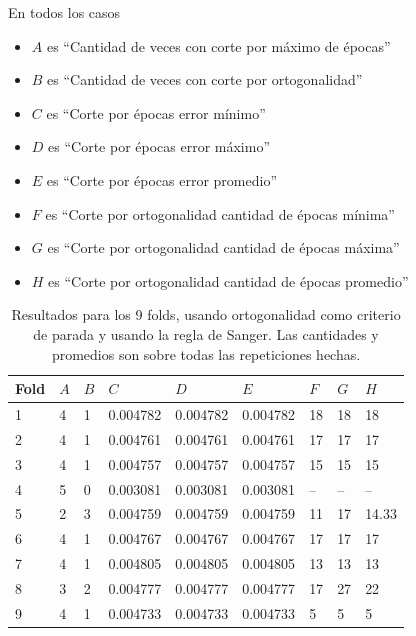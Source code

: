 \documentclass[informe.tex]{subfiles}
\begin{document}
	En todos los casos 
	\begin{itemize}
	\item $A$ es ``Cantidad de veces con corte por máximo de épocas''
	\item $B$ es ``Cantidad de veces con corte por ortogonalidad''
	\item $C$ es ``Corte por épocas error mínimo''
	\item $D$ es ``Corte por épocas error máximo''
	\item $E$ es ``Corte por épocas error promedio''
	\item $F$ es ``Corte por ortogonalidad cantidad de épocas mínima''
	\item $G$ es ``Corte por ortogonalidad cantidad de épocas máxima''
	\item $H$ es ``Corte por ortogonalidad cantidad de épocas promedio''
	\end{itemize}
  
	
	\begin{table}[H]
	  \centering
	  \begin{tabular}{|l|l|l|l|l|l|l|l|l|} \hline
	  Fold & $A$ & $B$ & $C$ & $D$ & $E$ & $F$ & $G$ & $H$ \\ \hline
	  1& 4 & 1 & 0.004782 & 0.004782 & 0.004782 & 18 & 18 & 18 \\ \hline
	  2& 4 & 1 & 0.004761 & 0.004761 & 0.004761 & 17 & 17 & 17 \\ \hline
	  3& 4 & 1 & 0.004757 & 0.004757 & 0.004757 & 15 & 15 & 15 \\ \hline
	  4& 5 & 0 & 0.003081 & 0.003081 & 0.003081 & -- & -- & -- \\ \hline
	  5& 2 & 3 & 0.004759 & 0.004759 & 0.004759 & 11 & 17 & 14.33 \\ \hline
	  6& 4 & 1 & 0.004767 & 0.004767 & 0.004767 & 17 & 17 & 17 \\ \hline
	  7& 4 & 1 & 0.004805 & 0.004805 & 0.004805 & 13 & 13 & 13 \\ \hline
	  8& 3 & 2 & 0.004777 & 0.004777 & 0.004777 & 17 & 27 & 22 \\ \hline
	  9& 4 & 1 & 0.004733 & 0.004733 & 0.004733 & 5 & 5 & 5 \\ \hline
	  \end{tabular}
	  \caption{Resultados para los 9 folds, usando ortogonalidad como criterio de parada y usando la regla de Sanger. Las cantidades y promedios son sobre todas las repeticiones hechas.}
	  \label{tab:ortogonalidad_sanger500}
	\end{table}
\end{document}
